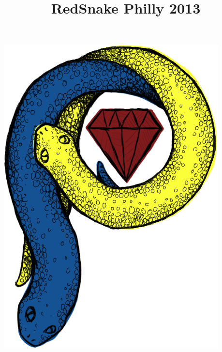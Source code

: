 \documentclass[xcolor=dvipsnames,red]{beamer}
\title{RedSnake Philly 2013}
\date{}
\begin{document}
\begin{frame}[plain]
\titlepage
\vspace{-2 cm}
\begin{center}
\includegraphics[width=.4\textwidth]{imgs/rs-logo-2.png}
\end{center}
\end{frame}
\end{document}
